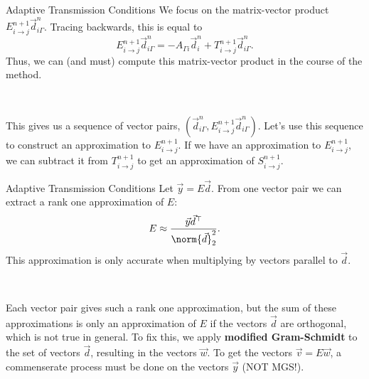 \documentclass{beamer}
\begin{document}
\begin{frame}{Adaptive Transmission Conditions}
We focus on the matrix-vector product $E_{i \to j}^{n+1} \vec{d}_{i \Gamma}^n$.
Tracing backwards, this is equal to
\begin{equation*}
	E_{i \to j}^{n+1} \vec{d}_{i \Gamma}^n = -A_{\Gamma i} \vec{d}_i^n + T_{i \to j}^{n+1} \vec{d}_{i \Gamma}^n.
\end{equation*}
Thus, we can (and must) compute this matrix-vector product in the course of the method.

~

This gives us a sequence of vector pairs, $(\vec{d}_{i \Gamma}^n, E_{i \to j}^{n+1} \vec{d}_{i \Gamma}^n)$.
Let's use this sequence to construct an approximation to $E_{i \to j}^{n+1}$.
If we have an approximation to $E_{i \to j}^{n+1}$, we can subtract it from $T_{i \to j}^{n+1}$ to get an approximation of $S_{i \to j}^{n+1}$.
\end{frame}

\begin{frame}{Adaptive Transmission Conditions}
Let $\vec{y} = E \vec{d}$.
From one vector pair we can extract a rank one approximation of $E$:
\begin{equation*}
	E \approx \frac{\vec{y} \vec{d}^\top}{\norm{\vec{d}}_2^2}.
\end{equation*}
This approximation is only accurate when multiplying by vectors parallel to $\vec{d}$.

~

Each vector pair gives such a rank one approximation, but the sum of these approximations is only an approximation of $E$ if the vectors $\vec{d}$ are orthogonal, which is not true in general.
To fix this, we apply \textbf{modified Gram-Schmidt} to the set of vectors $\vec{d}$, resulting in the vectors $\vec{w}$.
To get the vectors $\vec{v}=E \vec{w}$, a commenserate process must be done on the vectors $\vec{y}$ (NOT MGS!).
\end{frame}
\end{document}
